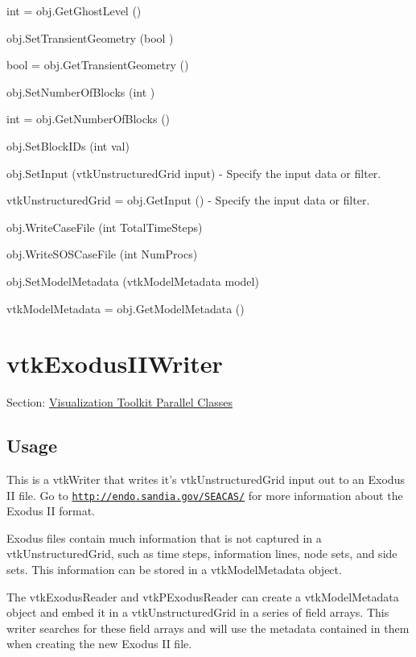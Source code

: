 \begin{DoxyItemize}
\item {\ttfamily int = obj.\-Get\-Ghost\-Level ()}  
\item {\ttfamily obj.\-Set\-Transient\-Geometry (bool )}  
\item {\ttfamily bool = obj.\-Get\-Transient\-Geometry ()}  
\item {\ttfamily obj.\-Set\-Number\-Of\-Blocks (int )}  
\item {\ttfamily int = obj.\-Get\-Number\-Of\-Blocks ()}  
\item {\ttfamily obj.\-Set\-Block\-I\-Ds (int val)}  
\item {\ttfamily obj.\-Set\-Input (vtk\-Unstructured\-Grid input)} -\/ Specify the input data or filter.  
\item {\ttfamily vtk\-Unstructured\-Grid = obj.\-Get\-Input ()} -\/ Specify the input data or filter.  
\item {\ttfamily obj.\-Write\-Case\-File (int Total\-Time\-Steps)}  
\item {\ttfamily obj.\-Write\-S\-O\-S\-Case\-File (int Num\-Procs)}  
\item {\ttfamily obj.\-Set\-Model\-Metadata (vtk\-Model\-Metadata model)}  
\item {\ttfamily vtk\-Model\-Metadata = obj.\-Get\-Model\-Metadata ()}  
\end{DoxyItemize}\hypertarget{vtkparallel_vtkexodusiiwriter}{}\section{vtk\-Exodus\-I\-I\-Writer}\label{vtkparallel_vtkexodusiiwriter}
Section\-: \hyperlink{sec_vtkparallel}{Visualization Toolkit Parallel Classes} \hypertarget{vtkwidgets_vtkxyplotwidget_Usage}{}\subsection{Usage}\label{vtkwidgets_vtkxyplotwidget_Usage}
This is a vtk\-Writer that writes it's vtk\-Unstructured\-Grid input out to an Exodus I\-I file. Go to \href{http://endo.sandia.gov/SEACAS/}{\tt http\-://endo.\-sandia.\-gov/\-S\-E\-A\-C\-A\-S/} for more information about the Exodus I\-I format.

Exodus files contain much information that is not captured in a vtk\-Unstructured\-Grid, such as time steps, information lines, node sets, and side sets. This information can be stored in a vtk\-Model\-Metadata object.

The vtk\-Exodus\-Reader and vtk\-P\-Exodus\-Reader can create a vtk\-Model\-Metadata object and embed it in a vtk\-Unstructured\-Grid in a series of field arrays. This writer searches for these field arrays and will use the metadata contained in them when creating the new Exodus I\-I file.

